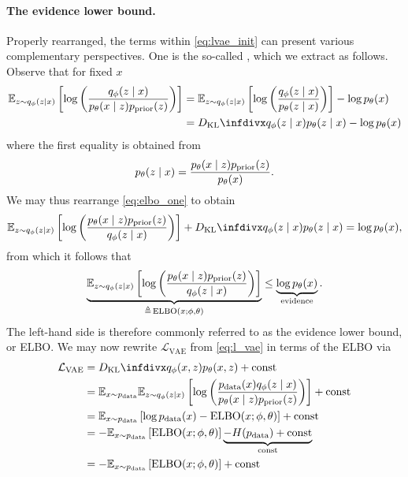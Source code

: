 \paragraph{The evidence lower bound.}
    Properly rearranged, the terms within \cref{eq:lvae_init} can present various complementary perspectives. One is the so-called , which we extract as follows. Observe that for fixed $x$
    \begin{equation}
    \begin{aligned}
        \EE_{z\sim q_\phi(z|x)} \left[\log \left(\frac{q_\phi(z\mid x)}{p_\theta(x\mid z)\prior(z)}\right)\right]
        &= \EE_{z\sim q_\phi(z|x)} \left[\log \left(\frac{q_\phi(z\mid x)}{p_\theta(z\mid x)}\right)\right] - \log p_\theta(x)\\
        &= \dkl{q_\phi(z\mid x)}{p_\theta(z\mid x)} - \log p_\theta(x)
    \end{aligned}
    \label{eq:elbo_one}
    \end{equation}
    where the first equality is obtained from 
    \begin{equation*}
        p_\theta(z\mid x) = \frac{p_\theta(x\mid z)p_{\text{prior}}(z)}{p_\theta(x)}.
    \end{equation*}
    We may thus rearrange \cref{eq:elbo_one} to obtain
    \begin{equation}
        \EE_{z\sim q_\phi(z|x)} \left[\log \left(\frac{p_\theta(x\mid z)\prior(z)}{q_\phi(z\mid x)}\right)\right] + \dkl{q_\phi(z\mid x)}{p_\theta(z\mid x)} = \log p_\theta(x),
    \end{equation}
    from which it follows that 
    \begin{equation}
        \underbrace{\mathbb{E}_{z\sim q_\phi(z|x)} \left[\log \left(\frac{p_\theta(x\mid z)p_{\text{prior}}(z)}{q_\phi(z\mid x)}\right)\right]}_{\triangleq \,\text{ELBO}(x;\phi, \theta)} \le \underbrace{\log p_\theta(x)}_{\text{evidence}}.
    \end{equation}
    The left-hand side is therefore commonly referred to as the evidence lower bound, or ELBO. We may now rewrite $\mathcal{L}_{\text{VAE}}$ from \cref{eq:l_vae} in terms of the ELBO via
    \begin{equation}
        \begin{aligned}
            \mathcal{L}_{\text{VAE}}
            &= \dkl{q_\phi(x,z)}{p_\theta(x,z)}+\text{const}\\
            &= \mathbb{E}_{x \sim \pdata} \mathbb{E}_{z \sim q_\phi(z|x)} \left[\log \left(\frac{\pdata(x)q_\phi(z\mid x)}{p_\theta(x\mid z)\prior(z)}\right)\right] + \text{const}\\
            &= \mathbb{E}_{x \sim \pdata} \left[\log \pdata(x) - \text{ELBO}(x; \phi, \theta)\right] + \text{const}\\
            &= -\mathbb{E}_{x \sim \pdata} \left[\text{ELBO}(x; \phi, \theta)\right] \underbrace{- H(\pdata) + \text{const}}_{\text{const}}\\
            &= -\mathbb{E}_{x \sim \pdata} \left[\text{ELBO}(x; \phi, \theta)\right] + \text{const}
        \end{aligned}
    \end{equation}
